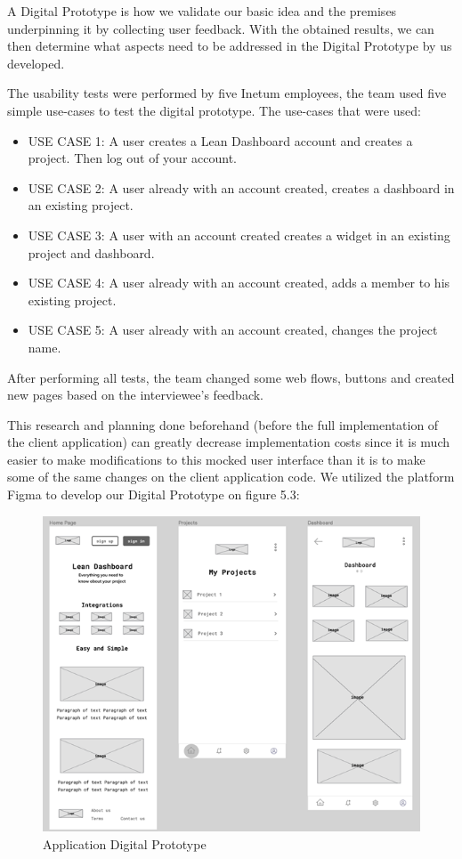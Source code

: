 \documentclass[a4paper,twoside,10pt]{report}
\begin{document}
A Digital Prototype is how we validate our basic idea and the premises underpinning it by collecting user feedback.
With the obtained results, we can then determine what aspects need to be addressed in the Digital Prototype by us developed.

The usability tests were performed by five Inetum employees, the team used five simple use-cases to test the digital prototype. The use-cases that were used: 
 \begin{itemize}
	\item USE CASE 1: A user creates a Lean Dashboard account and creates a project. Then log out of your account.
	\item USE CASE 2: A user already with an account created, creates a dashboard in an existing project.
	\item USE CASE 3: A user with an account created creates a widget in an existing project and dashboard.
	\item USE CASE 4: A user already with an account created, adds a member to his existing project.
	\item USE CASE 5: A user already with an account created, changes the project name.
\end{itemize}	

After performing all tests, the team changed some web flows, buttons and created new pages based on the interviewee's feedback. 

This research and planning done beforehand (before the full implementation of the client application) can greatly decrease implementation costs since it is much easier to make modifications to this mocked user interface than it is to make some of the same changes on the client application code.
We utilized the platform Figma\cite{FIGMA} to develop our Digital Prototype on figure 5.3:
 
\begin{figure}[h!]
\center
  \includegraphics[width=\textwidth]{digital-prototype.png}
\caption{Application Digital Prototype}
\end{figure}
\end{document}
